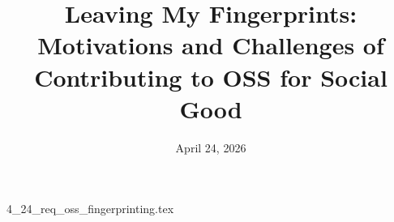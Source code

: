 \documentclass{article}      %
\title{Leaving My Fingerprints: Motivations and Challenges of Contributing to OSS for Social Good}  %
\date{April 24, 2026}
\begin{document}

\maketitle                   %



{4_24_req_oss_fingerprinting.tex}
\end{document}
